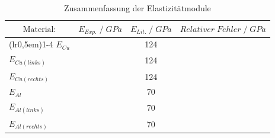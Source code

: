 \begin{table}[H]
\centering
    \begin{tabular}{l l c l}
    \toprule
        \multicolumn{1}{c}{$\text{Material:}$} & \multicolumn{1}{c}{$E_{Exp.}\;/\;GPa$} & \multicolumn{1}{c}{$E_{Lit.}\;/\;GPa$} & \multicolumn{1}{c}{$Relativer\;Fehler\;/\;GPa$}\\
        \cmidrule(lr{0,5em}){1-4}
        $E_{Cu}$            & \text{}    & 124   & \text{}\\
        $E_{Cu(links)}$     & \text{}   & 124   & \text{}\\
        $E_{Cu(rechts)}$    & \text{}   & 124   & \text{}\\
        $E_{Al}$            & \text{}    & 70    & \text{}\\
        $E_{Al(links)}$     & \text{}   & 70    & \text{}\\
        $E_{Al(rechts)}$    & \text{}   & 70    & \text{}\\
        \bottomrule
    \end{tabular}
\caption{Zusammenfassung der Elastizitätmodule}
\label{tab:7}
\end{table}
\newpage

\printbibliography
